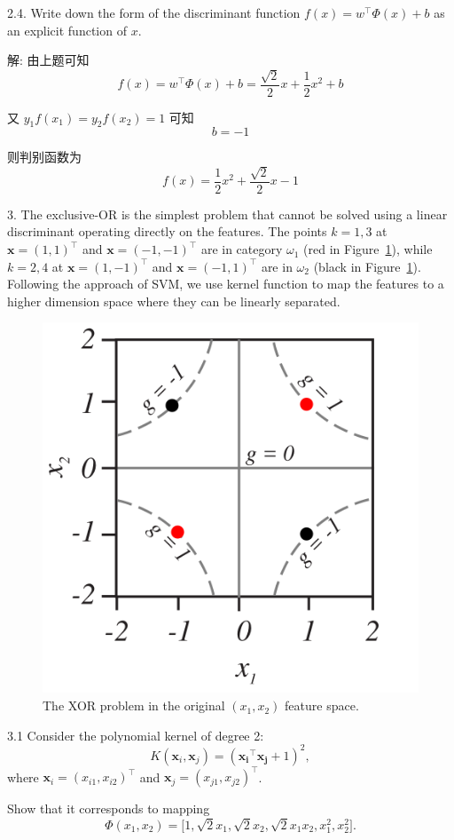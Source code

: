 \documentclass[openany]{ctexbook}
\theoremstyle{kaiti}
\theoremstyle{normal}
\begin{document}
2.4. Write down the form of the discriminant function $ f(x) = w^{\top}\Phi(x) + b$ as an explicit function of $x$.

解: 由上题可知
\begin{equation}
  f(x) = w^{\top}\Phi(x) + b=\frac{\sqrt{2}}{2}x+\frac{1}{2}x^2+b
\end{equation}

又 $y_1f(x_1)=y_2f(x_2)=1$ 可知
\begin{equation}
  b=-1
\end{equation}

则判别函数为
\begin{equation}
  f(x)=\frac{1}{2}x^2+\frac{\sqrt{2}}{2}x-1
\end{equation}

3. The exclusive-OR is the simplest problem that cannot be solved using a linear discriminant operating directly on the features. The points $k=1,3$ at $\bm{x}=(1,1)^{\top}$ and $\bm{x}=(-1,-1)^{\top}$ are in category $\omega_1$ (red in Figure~\ref{fig:xor}), while $k=2,4$ at $\bm{x}=(1,-1)^{\top}$ and $\bm{x}=(-1,1)^{\top}$ are in $\omega_2$ (black in Figure~\ref{fig:xor}). Following the approach of SVM, we use kernel function to map the features to a higher dimension space where they can be linearly separated.

\begin{figure}[htbp]
    \centering
    \includegraphics[width=0.3\linewidth]{XOR.PNG}
    \caption{The XOR problem in the original $(x_1,x_2)$ feature space.}
    \label{fig:xor}
\end{figure}

3.1 Consider the polynomial kernel of degree 2: 
\begin{equation}
  K(\bm{x}_i,\bm{x}_j) = (\bm{x_i}^{\top}\bm{x_j}+1)^2,
\end{equation}
where $\bm{x}_i = (x_{i1}, x_{i2})^{\top}$ and $\bm{x}_j=(x_{j1}, x_{j2})^{\top}$.

Show that it corresponds to mapping 
\begin{equation}
  \Phi(x_1, x_2) = \Big[1, \sqrt{2}x_1, \sqrt{2}x_2, \sqrt{2}x_1x_2, x_1^2, x_2^2\Big].
\end{equation}
\end{document}

